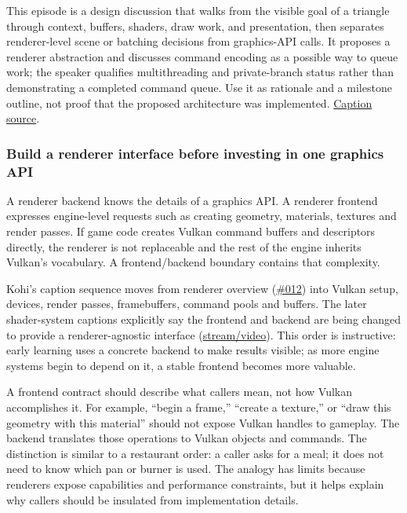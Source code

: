 This episode is a design discussion that walks from the visible goal of a triangle through context, buffers, shaders, draw work, and presentation, then separates renderer-level scene or batching decisions from graphics-API calls. It proposes a renderer abstraction and discusses command encoding as a possible way to queue work; the speaker qualifies multithreading and private-branch status rather than demonstrating a completed command queue. Use it as rationale and a milestone outline, not proof that the proposed architecture was implemented. \href{https://www.youtube.com/watch?v=Hoi-Gzk-How}{Caption source}.

\subsubsection{Build a renderer interface before investing in one graphics API}\label{build-a-renderer-interface-before-investing-in-one-graphics-api}

A renderer backend knows the details of a graphics API. A renderer frontend expresses engine-level requests such as creating geometry, materials, textures and render passes. If game code creates Vulkan command buffers and descriptors directly, the renderer is not replaceable and the rest of the engine inherits Vulkan's vocabulary. A frontend/backend boundary contains that complexity.

Kohi's caption sequence moves from renderer overview (\href{https://www.youtube.com/watch?v=70q9jtjWP4o}{\#012}) into Vulkan setup, devices, render passes, framebuffers, command pools and buffers. The later shader-system captions explicitly say the frontend and backend are being changed to provide a renderer-agnostic interface (\href{https://www.youtube.com/watch?v=4E0v_5Wva-8}{stream/video}). This order is instructive: early learning uses a concrete backend to make results visible; as more engine systems begin to depend on it, a stable frontend becomes more valuable.

A frontend contract should describe what callers mean, not how Vulkan accomplishes it. For example, ``begin a frame,'' ``create a texture,'' or ``draw this geometry with this material'' should not expose Vulkan handles to gameplay. The backend translates those operations to Vulkan objects and commands. The distinction is similar to a restaurant order: a caller asks for a meal; it does not need to know which pan or burner is used. The analogy has limits because renderers expose capabilities and performance constraints, but it helps explain why callers should be insulated from implementation details.

